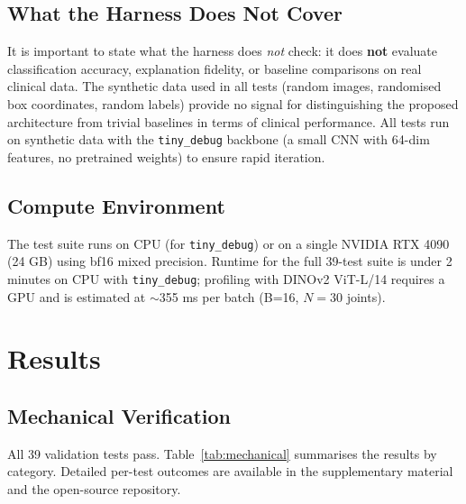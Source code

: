 \documentclass{article}
\begin{document}
\subsection{What the Harness Does Not Cover}
It is important to state what the harness does \emph{not} check: it does \textbf{not} evaluate classification accuracy, explanation fidelity, or baseline comparisons on real clinical data. The synthetic data used in all tests (random images, randomised box coordinates, random labels) provide no signal for distinguishing the proposed architecture from trivial baselines in terms of clinical performance. All tests run on synthetic data with the \texttt{tiny\_debug} backbone (a small CNN with 64-dim features, no pretrained weights) to ensure rapid iteration.

\subsection{Compute Environment}
The test suite runs on CPU (for \texttt{tiny\_debug}) or on a single NVIDIA RTX 4090 (24 GB) using bf16 mixed precision. Runtime for the full 39-test suite is under 2 minutes on CPU with \texttt{tiny\_debug}; profiling with DINOv2 ViT-L/14 requires a GPU and is estimated at $\sim$355 ms per batch (B=16, $N=30$ joints).

\section{Results}
\label{sec:results}

\subsection{Mechanical Verification}

All 39 validation tests pass. Table~\ref{tab:mechanical} summarises the results by category. Detailed per-test outcomes are available in the supplementary material and the open-source repository.
\end{document}
